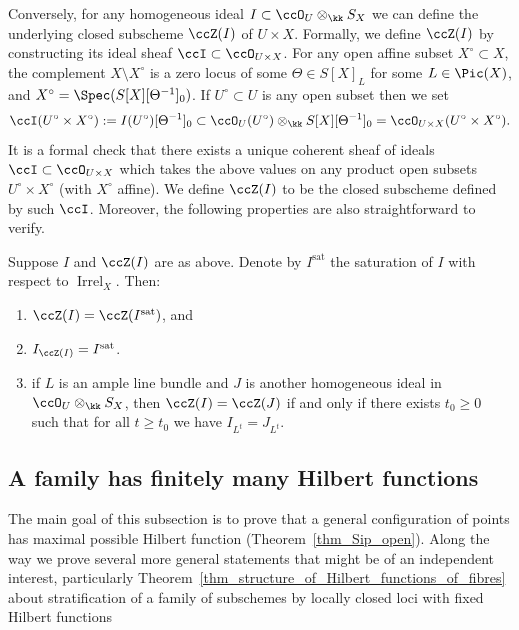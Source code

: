 \documentclass[12pt,a4paper]{article}
\DeclareMathOperator{\sat}{sat}
\newcommand{\Irrel}[1]{\operatorname {Irrel}_{#1}}
\begin{document}
Conversely, for any homogeneous ideal  $I\subset \ccO_U \otimes_{\kk} S_X$ we can define the underlying closed subscheme $\ccZ(I)$ of $U\times X$.
 Formally, we define $\ccZ(I)$ by constructing its ideal sheaf $\ccI\subset \ccO_{U\times X}$.
For any open affine subset $X^{\circ}\subset X$, the complement $X\setminus
X^{\circ}$ is a zero locus of some $\Theta\in S[X]_L$ for some $L\in \Pic(X)$, and $X^{\circ}= \Spec(S[X][\Theta^{-1}]_0)$.
If $U^{\circ}\subset U$ is any open subset
then we set
\[
  \ccI(U^{\circ}\times X^{\circ}):=I(U^{\circ})[\Theta^{-1}]_0\subset \ccO_{U}(U^{\circ})\otimes_{\kk} S[X][\Theta^{-1}]_0 = \ccO_{U\times X}(U^{\circ}\times X^{\circ}).
\]
It is a formal check that there exists a unique coherent sheaf of ideals $\ccI\subset \ccO_{U\times X}$ which takes the above values on any product
open subsets $U^{\circ}\times X^{\circ}$ (with $X^{\circ}$ affine).
We define $\ccZ(I)$ to be the closed subscheme defined by such $\ccI$.
Moreover, the following properties are also straightforward to verify.
\begin{prop}
\label{prop_zero_scheme_of_ideal}
   Suppose $I$ and $\ccZ(I)$ are as above. Denote by $I^{\sat}$ the saturation of $I$ with respect to $\Irrel{X}$. Then:
   \begin{enumerate}
    \item \label{item_zero_scheme_of_ideal_and_its_saturation}
         $\ccZ(I)=\ccZ(I^{\sat})$, and
    \item
    \label{item_ideal_of_zero_scheme}
       $I_{\ccZ(I)} = I^{\sat}$.
    \item
    \label{item_two_ideals_have_the_same_zero_scheme}
       if $L$ is an ample line bundle and $J$ is another homogeneous ideal in $\ccO_U \otimes_{\kk} S_X$, then
    $\ccZ(I) = \ccZ(J)$ if and only if there exists $t_0\geqslant 0$ such that for all $t\geqslant t_0$ we have $I_{L^{t}} = J_{L^{t}}$.
   \end{enumerate}
\end{prop}
\noprf


\subsection{A family has finitely many  Hilbert functions}

The main goal of this subsection is to prove that a general configuration of points has maximal possible Hilbert function (Theorem~\ref{thm_Sip_open}).
Along the way we prove several more general statements that might be of an independent interest, particularly Theorem~\ref{thm_structure_of_Hilbert_functions_of_fibres} about stratification of a family of subschemes by locally closed loci with fixed Hilbert functions
\end{document}
